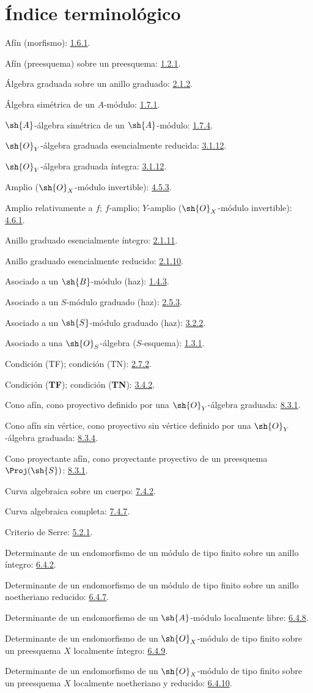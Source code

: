 \documentclass[oneside,10pt]{amsart}
\newcommand{\oldpage}[2][]{\marginnote{\normalfont\footnotesize\textbf{#1}~|~#2}\ignorespaces}
\begin{document}
\endgroup

\clearpage
\oldpage[II]{209}
{}
\section*{Índice terminológico}

\begingroup
\small
\setlength{\parindent}{0pt}
\setlength{\parskip}{2pt}
\newcommand{\egaTerm}[2]{#1: #2.\par}

\egaTerm{Afín (morfismo)}{\hyperref[II.1.6.1]{1.6.1}}
\egaTerm{Afín (preesquema) sobre un preesquema}{\hyperref[II.1.2.1]{1.2.1}}
\egaTerm{Álgebra graduada sobre un anillo graduado}{\hyperref[II.2.1.2]{2.1.2}}
\egaTerm{Álgebra simétrica de un $A$-módulo}{\hyperref[II.1.7.1]{1.7.1}}
\egaTerm{$\sh{A}$-álgebra simétrica de un $\sh{A}$-módulo}{\hyperref[II.1.7.4]{1.7.4}}
\egaTerm{$\sh{O}_Y$-álgebra graduada esencialmente reducida}{\hyperref[II.3.1.12]{3.1.12}}
\egaTerm{$\sh{O}_Y$-álgebra graduada íntegra}{\hyperref[II.3.1.12]{3.1.12}}
\egaTerm{Amplio ($\sh{O}_X$-módulo invertible)}{\hyperref[II.4.5.3]{4.5.3}}
\egaTerm{Amplio relativamente a $f$; $f$-amplio; $Y$-amplio ($\sh{O}_X$-módulo invertible)}{\hyperref[II.4.6.1]{4.6.1}}
\egaTerm{Anillo graduado esencialmente íntegro}{\hyperref[II.2.1.11]{2.1.11}}
\egaTerm{Anillo graduado esencialmente reducido}{\hyperref[II.2.1.10]{2.1.10}}
\egaTerm{Asociado a un $\sh{B}$-módulo (haz)}{\hyperref[II.1.4.3]{1.4.3}}
\egaTerm{Asociado a un $S$-módulo graduado (haz)}{\hyperref[II.2.5.3]{2.5.3}}
\egaTerm{Asociado a un $\sh{S}$-módulo graduado (haz)}{\hyperref[II.3.2.2]{3.2.2}}
\egaTerm{Asociado a una $\sh{O}_S$-álgebra ($S$-esquema)}{\hyperref[II.1.3.1]{1.3.1}}

\egaTerm{Condición (TF); condición (TN)}{\hyperref[II.2.7.2]{2.7.2}}
\egaTerm{Condición (\textbf{TF}); condición (\textbf{TN})}{\hyperref[II.3.4.2]{3.4.2}}
\egaTerm{Cono afín, cono proyectivo definido por una $\sh{O}_Y$-álgebra graduada}{\hyperref[II.8.3.1]{8.3.1}}
\egaTerm{Cono afín sin vértice, cono proyectivo sin vértice definido por una $\sh{O}_Y$-álgebra graduada}{\hyperref[II.8.3.4]{8.3.4}}
\egaTerm{Cono proyectante afín, cono proyectante proyectivo de un preesquema $\Proj(\sh{S})$}{\hyperref[II.8.3.1]{8.3.1}}
\egaTerm{Curva algebraica sobre un cuerpo}{\hyperref[II.7.4.2]{7.4.2}}
\egaTerm{Curva algebraica completa}{\hyperref[II.7.4.7]{7.4.7}}
\egaTerm{Criterio de Serre}{\hyperref[II.5.2.1]{5.2.1}}

\egaTerm{Determinante de un endomorfismo de un módulo de tipo finito sobre un anillo íntegro}{\hyperref[II.6.4.2]{6.4.2}}
\egaTerm{Determinante de un endomorfismo de un módulo de tipo finito sobre un anillo noetheriano reducido}{\hyperref[II.6.4.7]{6.4.7}}
\egaTerm{Determinante de un endomorfismo de un $\sh{A}$-módulo localmente libre}{\hyperref[II.6.4.8]{6.4.8}}
\egaTerm{Determinante de un endomorfismo de un $\sh{O}_X$-módulo de tipo finito sobre un preesquema $X$ localmente íntegro}{\hyperref[II.6.4.9]{6.4.9}}
\egaTerm{Determinante de un endomorfismo de un $\sh{O}_X$-módulo de tipo finito sobre un preesquema $X$ localmente noetheriano y reducido}{\hyperref[II.6.4.10]{6.4.10}}
\end{document}
